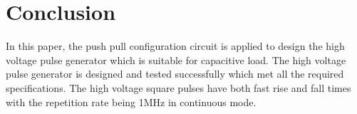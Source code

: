 \documentclass[aip,rsi,reprint,graphicx]{revtex4-1} %
\begin{document}

\section{Conclusion}
In this paper, the push pull configuration circuit is applied to design the high voltage pulse generator which is suitable for capacitive load. The high voltage pulse generator is designed and tested successfully which met all the required specifications. The high voltage square pulses have both fast rise and fall times with the repetition rate being 1MHz in continuous mode.


%
%
\end{document}
